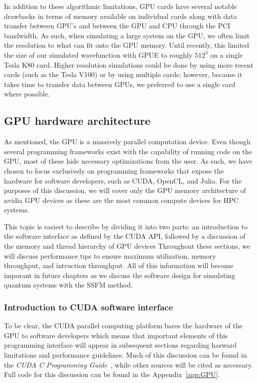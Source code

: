 In addition to these algorithmic limitations, GPU cards have several notable drawbacks in terms of memory available on individual cards along with data transfer between GPU's and between the GPU and CPU through the PCI bandwidth.
As such, when simulating a large system on the GPU, we often limit the resolution to what can fit onto the GPU memory.
Until recently, this limited the size of our simulated wavefunction with GPUE to roughly $512^3$ on a single Tesla K80 card.
Higher resolution simulations could be done by using more recent cards (such as the Tesla V100) or by using multiple cards; however, because it takes time to transfer data between GPUs, we preferred to use a single card where possible.


\subsection{GPU hardware architecture}

As mentioned, the GPU is a massively parallel computation device.
Even though several programming frameworks exist with the capability of running code on the GPU, most of these hide necessary optimizations from the user.
As such, we have chosen to focus exclusively on programming frameworks that expose the hardware for software developers, such as CUDA, OpenCL, and Julia.
For the purposes of this discussion, we will cover only the GPU memory architecture of nvidia GPU devices as these are the most common compute devices for HPC systems.

This topic is easiest to describe by dividing it into two parts: an introduction to the software interface as defined by the CUDA API, followed by a discussion of the memory and thread hierarchy of GPU devices
Throughout these sections, we will discuss performance tips to ensure maximum utilization, memory throughput, and intruction throughput.
All of this information will become imporant in future chapters as we discuss the software design for simulating quantum systems with the SSFM method.

\subsubsection{Introduction to CUDA software interface}

To be clear, the CUDA parallel computing platform bares the hardware of the GPU to software developers which means that important elements of this programming interface will appear in subsequent sections regarding harward limitations and performance guidelines.
Much of this discussion can be found in the \textit{CUDA C Programming Guide}~\cite{CUDAPG}, while other sources will be cited as necessary.
Full code for this discussion can be found in the Appendix~\ref{app:GPU}.


